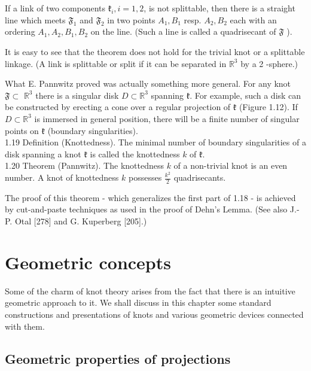 \documentclass[10pt, letterpaper]{article}
\begin{document}
If a link of two components $\mathfrak{k}_{i}, i=1,2$, is not splittable, then there is a straight line which meets $\mathfrak{F}_{1}$ and $\mathfrak{F}_{2}$ in two points $A_{1}, B_{1}$ resp. $A_{2}, B_{2}$ each with an ordering $A_{1}, A_{2}, B_{1}, B_{2}$ on the line. (Such a line is called a quadrisecant of $\mathfrak{F}$ ).

It is easy to see that the theorem does not hold for the trivial knot or a splittable linkage. (A link is splittable or split if it can be separated in $\mathbb{R}^{3}$ by a 2 -sphere.)

What E. Pannwitz proved was actually something more general. For any knot $\mathfrak{F} \subset$ $\mathbb{R}^{3}$ there is a singular disk $D \subset \mathbb{R}^{3}$ spanning $\mathfrak{k}$. For example, such a disk can be constructed by erecting a cone over a regular projection of $\mathfrak{k}$ (Figure 1.12). If $D \subset \mathbb{R}^{3}$ is immersed in general position, there will be a finite number of singular points on $\mathfrak{k}$ (boundary singularities).\\
1.19 Definition (Knottedness). The minimal number of boundary singularities of a disk spanning a knot $\mathfrak{k}$ is called the knottedness $k$ of $\mathfrak{k}$.\\
1.20 Theorem (Pannwitz). The knottedness $k$ of a non-trivial knot is an even number. A knot of knottedness $k$ possesses $\frac{k^{2}}{2}$ quadrisecants.

The proof of this theorem - which generalizes the first part of 1.18 - is achieved by cut-and-paste techniques as used in the proof of Dehn's Lemma. (See also J.-P. Otal [278] and G. Kuperberg [205].)





\pagebreak


\section{Geometric concepts}



Some of the charm of knot theory arises from the fact that there is an intuitive geometric approach to it. We shall discuss in this chapter some standard constructions and presentations of knots and various geometric devices connected with them.

\subsection{Geometric properties of projections}
\end{document}
